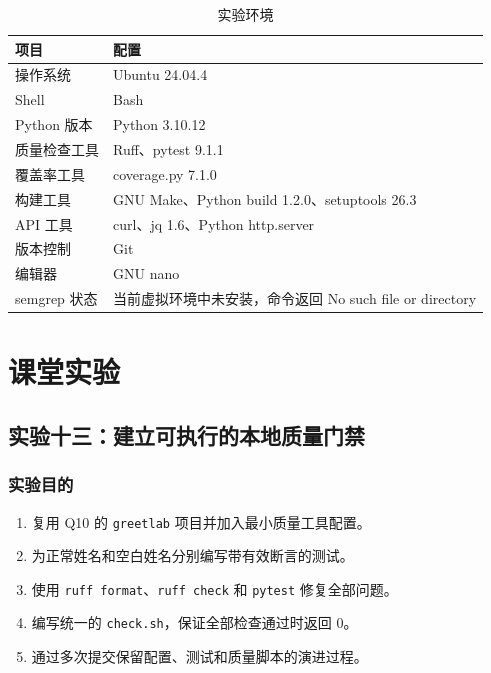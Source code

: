 \documentclass[UTF8,12pt,a4paper]{ctexart}
\begin{document}
\begin{table}[H]
    \centering
    \caption{实验环境}
    \label{tab:environment}
    \begin{tabular}{ll}
        \toprule
        项目 & 配置 \\
        \midrule
        操作系统 & Ubuntu 24.04.4 \\
        Shell & Bash \\
        Python 版本 & Python 3.10.12 \\
        质量检查工具 & Ruff、pytest 9.1.1 \\
        覆盖率工具 & coverage.py 7.1.0 \\
        构建工具 & GNU Make、Python build 1.2.0、setuptools 26.3 \\
        API 工具 & curl、jq 1.6、Python http.server \\
        版本控制 & Git \\
        编辑器 & GNU nano \\
        semgrep 状态 & 当前虚拟环境中未安装，命令返回 No such file or directory \\
        \bottomrule
    \end{tabular}
\end{table}

\section{课堂实验}

\subsection{实验十三：建立可执行的本地质量门禁}

\subsubsection{实验目的}

\begin{enumerate}[label=\arabic*.]
    \item 复用 Q10 的 \texttt{greetlab} 项目并加入最小质量工具配置。
    \item 为正常姓名和空白姓名分别编写带有效断言的测试。
    \item 使用 \texttt{ruff format}、\texttt{ruff check} 和 \texttt{pytest} 修复全部问题。
    \item 编写统一的 \texttt{check.sh}，保证全部检查通过时返回 0。
    \item 通过多次提交保留配置、测试和质量脚本的演进过程。
\end{enumerate}
\end{document}
